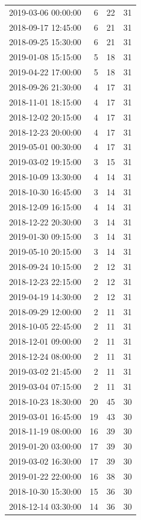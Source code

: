 \begin{tabular}{lrrr}
2019-03-06 00:00:00 & 6 & 22 & 31 \\
2018-09-17 12:45:00 & 6 & 21 & 31 \\
2018-09-25 15:30:00 & 6 & 21 & 31 \\
2019-01-08 15:15:00 & 5 & 18 & 31 \\
2019-04-22 17:00:00 & 5 & 18 & 31 \\
2018-09-26 21:30:00 & 4 & 17 & 31 \\
2018-11-01 18:15:00 & 4 & 17 & 31 \\
2018-12-02 20:15:00 & 4 & 17 & 31 \\
2018-12-23 20:00:00 & 4 & 17 & 31 \\
2019-05-01 00:30:00 & 4 & 17 & 31 \\
2019-03-02 19:15:00 & 3 & 15 & 31 \\
2018-10-09 13:30:00 & 4 & 14 & 31 \\
2018-10-30 16:45:00 & 3 & 14 & 31 \\
2018-12-09 16:15:00 & 4 & 14 & 31 \\
2018-12-22 20:30:00 & 3 & 14 & 31 \\
2019-01-30 09:15:00 & 3 & 14 & 31 \\
2019-05-10 20:15:00 & 3 & 14 & 31 \\
2018-09-24 10:15:00 & 2 & 12 & 31 \\
2018-12-23 22:15:00 & 2 & 12 & 31 \\
2019-04-19 14:30:00 & 2 & 12 & 31 \\
2018-09-29 12:00:00 & 2 & 11 & 31 \\
2018-10-05 22:45:00 & 2 & 11 & 31 \\
2018-12-01 09:00:00 & 2 & 11 & 31 \\
2018-12-24 08:00:00 & 2 & 11 & 31 \\
2019-03-02 21:45:00 & 2 & 11 & 31 \\
2019-03-04 07:15:00 & 2 & 11 & 31 \\
2018-10-23 18:30:00 & 20 & 45 & 30 \\
2019-03-01 16:45:00 & 19 & 43 & 30 \\
2018-11-19 08:00:00 & 16 & 39 & 30 \\
2019-01-20 03:00:00 & 17 & 39 & 30 \\
2019-03-02 16:30:00 & 17 & 39 & 30 \\
2019-01-22 22:00:00 & 16 & 38 & 30 \\
2018-10-30 15:30:00 & 15 & 36 & 30 \\
2018-12-14 03:30:00 & 14 & 36 & 30 \\

\end{tabular}
